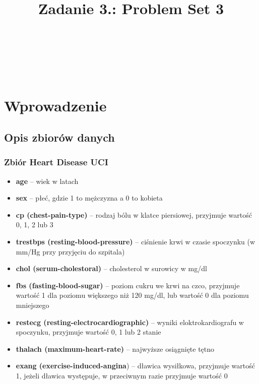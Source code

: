 \documentclass{classrep}
\author{%
    \studentinfo[239661@edu.p.lodz.pl]{Szymon Gruda}{239661}\\
    \studentinfo[239671@edu.p.lodz.pl]{Jan Karwowski}{239671}\\
    \studentinfo[239673@edu.p.lodz.pl]{Michał Kidawa}{239673}\\
    \studentinfo[239676@edu.p.lodz.pl]{Kamil Kowalewski}{239676}\\
}
\title{Zadanie 3.: Problem Set 3}
\begin{document}
    \maketitle
    \thispagestyle{fancyplain}

    \newpage
    \tableofcontents
    \newpage

    \section{Wprowadzenie}
    \label{intro} {

        \subsection{Opis zbiorów danych}
        \label{opis_zbiorow_intro} {

            \subsubsection{Zbiór Heart Disease UCI}
            \label{opis_zbiorow_intro_heart} {
                \begin{itemize}
                    \item \textbf{age} -- wiek w latach
                    \item \textbf{sex} -- płeć, gdzie 1 to mężczyzna a 0 to kobieta  
                    \item \textbf{cp (chest-pain-type)} -- rodzaj bólu w klatce piersiowej, przyjmuje wartość 0, 1, 2 lub 3  
                    \item  \textbf{trestbps (resting-blood-pressure)} -- ciśnienie krwi w czasie spoczynku (w mm/Hg przy przyjęciu do szpitala) 
                    \item \textbf{chol (serum-cholestoral)} -- cholesterol w surowicy w mg/dl  
                    \item \textbf{fbs (fasting-blood-sugar)} -- poziom cukru we krwi na czco, przyjmuje wartość 1 dla  poziomu większego niż 120 mg/dl, lub wartość 0 dla poziomu mniejszego
                    \item \textbf{restecg (resting-electrocardiographic)} -- wyniki eloktrokardiografu w spoczynku, przyjmuje wartość 0, 1 lub 2    stanie
                    \item \textbf{thalach (maximum-heart-rate)} -- najwyższe osiągnięte tętno   
                    \item \textbf{exang (exercise-induced-angina}) -- dławica wysiłkowa, przyjmuje wartość 1, jeżeli dławica występuje, w przeciwnym razie przyjmuje wartość 0

\end{itemize}}}}
\end{document}
